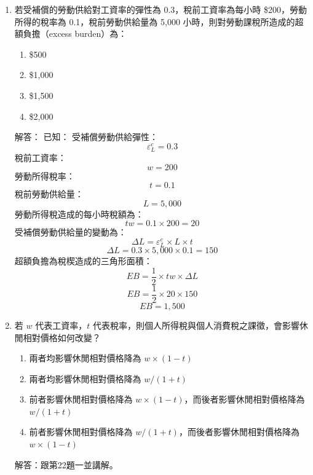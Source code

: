 \documentclass[12pt, a4paper]{article}
\begin{document}
\begin{enumerate}
    \item 若受補償的勞動供給對工資率的彈性為 0.3，稅前工資率為每小時 \$200，勞動所得的稅率為 0.1，稅前勞動供給量為 5,000 小時，則對勞動課稅所造成的超額負擔（excess burden）為：
    \begin{enumerate}[label=\Alph*.]
        \item \$500
        \item \$1,000
        \item \$1,500
        \item \$2,000
    \end{enumerate}
    解答：
    已知：
	受補償勞動供給彈性：
    \[
    \varepsilon_L^c = 0.3
    \]
    稅前工資率：
    \[
    w = 200
    \]
    勞動所得稅率：
    \[
    t = 0.1
    \]
    稅前勞動供給量：
    \[
    L = 5,000
    \]
    勞動所得稅造成的每小時稅額為：
    \[
    tw = 0.1 \times 200 = 20
    \]
    受補償勞動供給量的變動為：
    \[
    \Delta L = \varepsilon_L^c \times L \times t
    \]
    \[
    \Delta L = 0.3 \times 5,000 \times 0.1 = 150
    \]
    超額負擔為稅楔造成的三角形面積：
    \[
    EB = \frac{1}{2} \times tw \times \Delta L
    \]
    \[
    EB = \frac{1}{2} \times 20 \times 150
    \]
    \[
    EB = 1,500
    \]

    \item 若 \(w\) 代表工資率，\(t\) 代表稅率，則個人所得稅與個人消費稅之課徵，會影響休閒相對價格如何改變？
    \begin{enumerate}[label=\Alph*.]
        \item 兩者均影響休閒相對價格降為 \(w \times (1-t)\)
        \item 兩者均影響休閒相對價格降為 \(w/(1+t)\)
        \item 前者影響休閒相對價格降為 \(w \times (1-t)\)，而後者影響休閒相對價格降為 \(w/(1+t)\)
        \item 前者影響休閒相對價格降為 \(w/(1+t)\)，而後者影響休閒相對價格降為 \(w \times (1-t)\)
    \end{enumerate}
    解答：跟第22題一並講解。


\end{enumerate}
\end{document}

